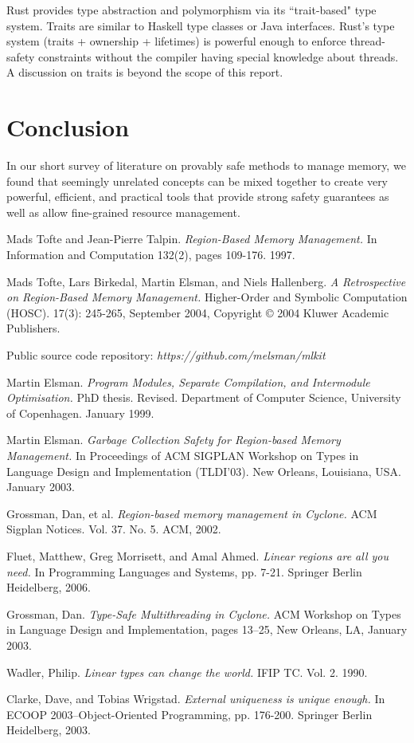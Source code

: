 \documentclass[11pt]{report}
\begin{document}
Rust provides type abstraction and polymorphism via its ``trait-based" type system. Traits are similar to Haskell type classes or Java interfaces. Rust's type system (traits + ownership + lifetimes) is powerful enough to enforce thread-safety constraints without the compiler having special knowledge about threads. A discussion on traits is beyond the scope of this report.

\chapter*{Conclusion}

In our short survey of literature on provably safe methods to manage memory, we found that seemingly unrelated concepts can be mixed together to create very powerful, efficient, and practical tools that provide strong safety guarantees as well as allow fine-grained resource management.

\begin{thebibliography}{4}
Mads Tofte and Jean-Pierre Talpin. \textit{Region-Based Memory Management.} In Information and Computation 132(2), pages 109-176. 1997.

Mads Tofte, Lars Birkedal, Martin Elsman, and Niels Hallenberg. \textit{A Retrospective on Region-Based Memory Management.} Higher-Order and Symbolic Computation (HOSC). 17(3): 245-265, September 2004, Copyright © 2004 Kluwer Academic Publishers.

Public source code repository: \textit{https://github.com/melsman/mlkit}

Martin Elsman. \textit{Program Modules, Separate Compilation, and Intermodule Optimisation.} PhD thesis. Revised. Department of Computer Science, University of Copenhagen. January 1999.
 
Martin Elsman. \textit{Garbage Collection Safety for Region-based Memory Management.} In Proceedings of ACM SIGPLAN Workshop on Types in Language Design and Implementation (TLDI’03). New Orleans, Louisiana, USA. January 2003.

Grossman, Dan, et al. \textit{Region-based memory management in Cyclone.} ACM Sigplan Notices. Vol. 37. No. 5. ACM, 2002.

Fluet, Matthew, Greg Morrisett, and Amal Ahmed. \textit{Linear regions are all you need.} In Programming Languages and Systems, pp. 7-21. Springer Berlin Heidelberg, 2006.

Grossman, Dan. \textit{Type-Safe Multithreading in Cyclone.} ACM Workshop on Types in Language Design and Implementation, pages 13–25, New Orleans, LA, January 2003.

Wadler, Philip. \textit{Linear types can change the world.} IFIP TC. Vol. 2. 1990.

Clarke, Dave, and Tobias Wrigstad. \textit{External uniqueness is unique enough.} In ECOOP 2003–Object-Oriented Programming, pp. 176-200. Springer Berlin Heidelberg, 2003.

\end{thebibliography}
\end{document}
